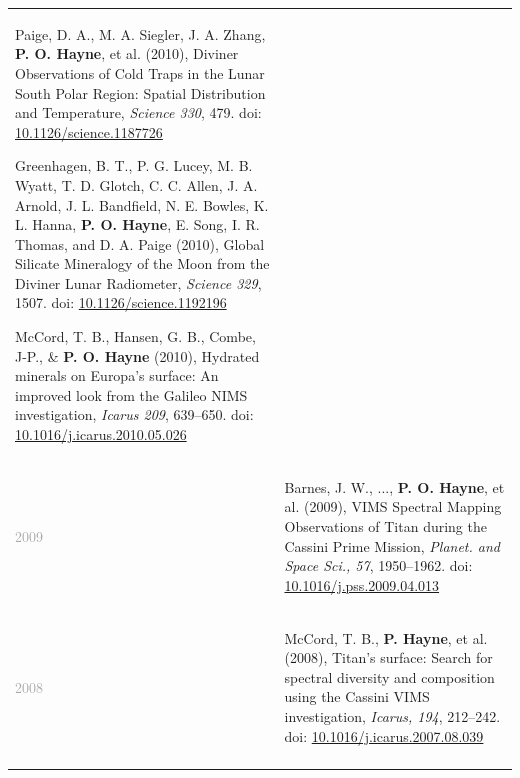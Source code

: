 \documentclass[letterpaper,10pt,twoside]{article}
\begin{document}
\begin{longtable}{@{} p{} p{}}
\begin{enumerate} [leftmargin=!,labelindent=2.5pt,itemindent=-10pt]
{            \item Paige, D. A., M. A. Siegler, J. A. Zhang, {\bf P. O. Hayne}, et al. (2010), Diviner Observations of Cold Traps in the Lunar South Polar Region: Spatial Distribution and Temperature, {\it Science 330}, 479. doi: \href{https://doi.org/10.1126/science.1187726}{10.1126/science.1187726}
    
            \item Greenhagen, B. T., P. G. Lucey, M. B. Wyatt, T. D. Glotch, C. C. Allen, J. A. Arnold, J. L. Bandfield, N. E. Bowles, K. L. Hanna, {\bf P. O. Hayne}, E. Song, I. R. Thomas, and D. A. Paige (2010), Global Silicate Mineralogy of the Moon from the Diviner Lunar Radiometer, {\it Science 329}, 1507. doi: \href{https://doi.org/10.1126/science.1192196}{10.1126/science.1192196}
    
            \item McCord, T. B., Hansen, G. B., Combe, J-P., \& {\bf P. O. Hayne} (2010), Hydrated minerals on Europa's surface: An improved look from the Galileo NIMS investigation, {\it Icarus 209}, 639--650. doi: \href{https://doi.org/10.1016/j.icarus.2010.05.026}{10.1016/j.icarus.2010.05.026}
            }
            \end{enumerate} \\
            
    \textcolor{darkgray}{2009}    & \begin{enumerate} [leftmargin=!,labelindent=2.5pt,itemindent=-10pt]\setcounter{enumi}{105}
            {\small
            \item Barnes, J. W., ..., {\bf P. O. Hayne}, et al. (2009), VIMS Spectral Mapping Observations of Titan during the Cassini Prime Mission, {\it Planet. and Space Sci., 57}, 1950--1962. doi: \href{https://doi.org/10.1016/j.pss.2009.04.013}{10.1016/j.pss.2009.04.013}
            }
            \end{enumerate} \\
            
    \textcolor{darkgray}{2008}    & \begin{enumerate} [leftmargin=!,labelindent=2.5pt,itemindent=-10pt]\setcounter{enumi}{106}
            {\small
            \item McCord, T. B., {\bf P. Hayne}, et al. (2008), Titan's surface: Search for spectral diversity and composition using the Cassini VIMS investigation, {\it Icarus, 194}, 212--242. doi: \href{https://doi.org/10.1016/j.icarus.2007.08.039}{10.1016/j.icarus.2007.08.039}
            }
            \end{enumerate} \\
    & \\
\end{longtable}
\end{document}
